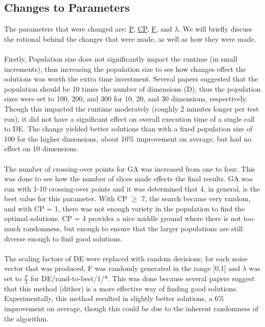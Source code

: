\documentclass[paper=a4, fontsize=11pt]{scrartcl} %
\numberwithin{equation}{section} %
\numberwithin{figure}{section} %
\numberwithin{table}{section} %
\begin{document}
	\subsection{Changes to Parameters}\label{S21}
	 The parameters that were changed are: \hyperref[T21]{P}, \hyperref[T21]{CP}, \hyperref[T21]{F}, and \hyperref[T21]{$\lambda$}. We will briefly discuss the rational behind the changes that were made, as well as how they were made.\\
	 \\Firstly, Population size does not significantly impact the runtime (in small increments), thus increasing the population size to see how changes effect the solutions was worth the extra time investment. Several papers suggested that the population should be 10 times the number of dimensions (D), thus the population sizes were set to 100, 200, and 300 for 10, 20, and 30 dimensions, respectively. Though this impacted the runtime moderately (roughly 2 minutes longer per test run), it did not have a significant effect on overall execution time of a single call to DE. The change yielded better solutions than with a fixed population size of 100 for the higher dimensions, about 10\% improvement on average, but had no effect on 10 dimensions.\\
	 \\The number of crossing-over points for GA was increased from one to four. This was done to see how the number of slices made effects the final results. GA was run with 1-10 crossing-over points and it was determined that 4, in general, is the best value for this parameter. With CP $\ge$ 7, the search became very random, and with CP = 1, there was not enough variety in the population to find the optimal solutions. CP = 4 provides a nice middle ground where there is not too much randomness, but enough to ensure that the larger populations are still diverse enough to find good solutions. \\
	 \\The scaling factors of DE were replaced with random decisions; for each noise vector that was produced, F was randomly generated in the range [0,1] and $\lambda$ was set to $\frac{F}{2}$ for DE/rand-to-best/1/*. This was done because several papers suggest that this method (dither) is a more effective way of finding good solutions. Experimentally, this method resulted in slightly better solutions, a 6\% improvement on average, though this could be due to the inherent randomness of the algorithm.\\
	 	 
\end{document}
